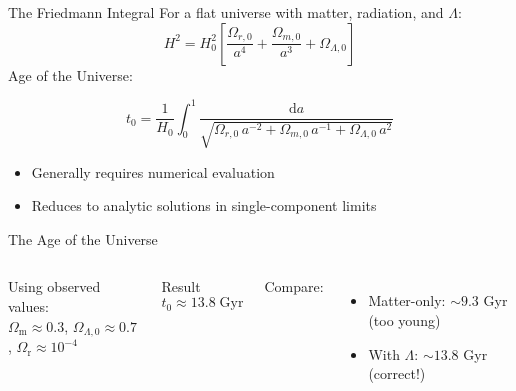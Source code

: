 \documentclass[aspectratio=169,11pt]{beamer}
\newcommand{\dd}{\mathrm{d}}
\newcommand{\Omm}{\Omega_{\mathrm{m}}}
\newcommand{\Omr}{\Omega_{\mathrm{r}}}
\newcommand{\Hnot}{H_0}
\begin{document}
\begin{frame}{The Friedmann Integral}
For a flat universe with matter, radiation, and $\Lambda$:
\begin{equation*}
    H^2 = \Hnot^2\!\left[
    \frac{\Omega_{r,0}}{a^4}+\frac{\Omega_{m,0}}{a^3}+\Omega_{\Lambda,0}
    \right]
\end{equation*}
Age of the Universe:
\begin{alertblock}{}
\begin{equation*}
    t_0 = \frac{1}{\Hnot}\int_0^1
    \frac{\dd a}{\sqrt{\Omega_{r,0}\,a^{-2}+\Omega_{m,0}\,a^{-1}+\Omega_{\Lambda,0}\,a^2}}
\end{equation*}
\end{alertblock}
\begin{itemize}
    \item Generally requires numerical evaluation
    \item Reduces to analytic solutions in single-component limits
\end{itemize}
\end{frame}

\begin{frame}{The Age of the Universe}
\begin{columns}[T]
Using observed values:\\
$\Omm\approx 0.3$, $\Omega_{\Lambda,0}\approx 0.7$, $\Omr\approx 10^{-4}$

\vspace{0.3cm}
\begin{exampleblock}{Result}
\begin{equation*}
    t_0 \approx 13.8\;\text{Gyr}
\end{equation*}
\end{exampleblock}

\vspace{0.2cm}
Compare:
\begin{itemize}
    \item Matter-only: $\sim9.3$ Gyr (too young)
    \item With $\Lambda$: $\sim13.8$ Gyr (\alert{correct!})
\end{itemize}

\vspace{0.3cm}
\end{columns}
\end{frame}
\end{document}
